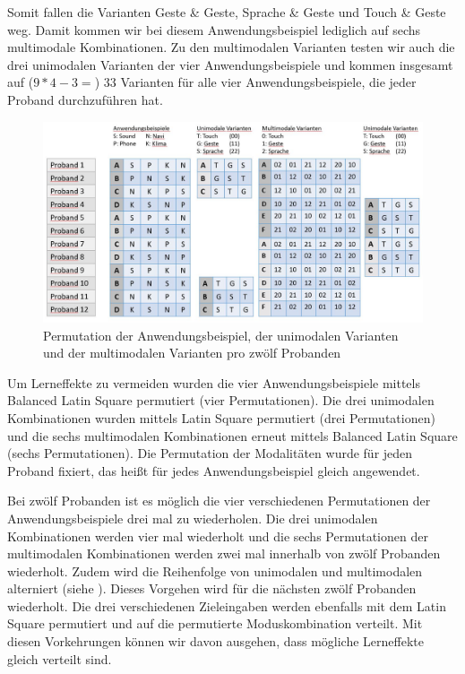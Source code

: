 Somit fallen die Varianten Geste \& Geste, Sprache \& Geste und Touch \& Geste weg. 
Damit kommen wir bei diesem Anwendungsbeispiel lediglich auf sechs multimodale Kombinationen. 
Zu den multimodalen Varianten testen wir auch die drei unimodalen Varianten der vier Anwendungsbeispiele und kommen insgesamt auf ($9*4-3=$) 33 Varianten für alle vier Anwendungsbeispiele, die jeder Proband durchzuführen hat. 
\begin{figure}[ht]
  \centering
  \includegraphics[width=1\textwidth]{img/Permutation.jpg}
  \caption[Permutation der Anwendungsbeispiel]{Permutation der Anwendungsbeispiel, der unimodalen Varianten und der multimodalen Varianten pro zwölf Probanden}
  \label{fig:Permutation}
\end{figure} 

Um Lerneffekte zu vermeiden wurden die vier Anwendungsbeispiele mittels Balanced Latin Square permutiert (vier Permutationen).
Die drei unimodalen Kombinationen wurden mittels Latin Square permutiert (drei Permutationen) und die sechs multimodalen Kombinationen erneut mittels Balanced Latin Square (sechs Permutationen).
Die Permutation der Modalitäten wurde für jeden Proband fixiert, das heißt für jedes Anwendungsbeispiel gleich angewendet. 

Bei zwölf Probanden ist es möglich die vier verschiedenen Permutationen der Anwendungsbeispiele drei mal zu wiederholen. 
Die drei unimodalen Kombinationen werden vier mal wiederholt und die sechs Permutationen der multimodalen Kombinationen werden zwei mal innerhalb von zwölf Probanden wiederholt. 
Zudem wird die Reihenfolge von unimodalen und multimodalen alterniert (siehe ). 
Dieses Vorgehen wird für die nächsten zwölf Probanden wiederholt. 
Die drei verschiedenen Zieleingaben werden ebenfalls mit dem Latin Square permutiert und auf die permutierte Moduskombination verteilt. 
Mit diesen Vorkehrungen können wir davon ausgehen, dass mögliche Lerneffekte gleich verteilt sind.

